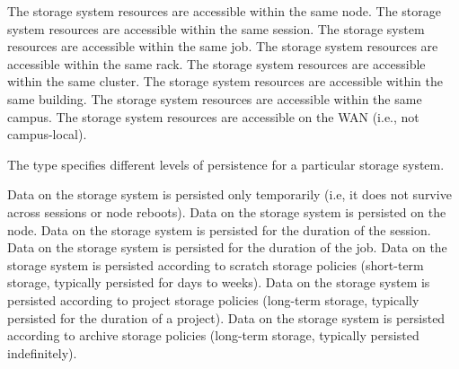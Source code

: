 \begin{constantdesc}
%
The storage system resources are accessible within the same node.
%
The storage system resources are accessible within the same session.
%
The storage system resources are accessible within the same job.
%
The storage system resources are accessible within the same rack.
%
The storage system resources are accessible within the same cluster.
%
The storage system resources are accessible within the same building.
%
The storage system resources are accessible within the same campus.
%
The storage system resources are accessible on the WAN (i.e., not campus-local).
%
\end{constantdesc}


The  type specifies different levels of persistence for a particular storage system.

\begin{constantdesc}
%
Data on the storage system is persisted only temporarily (i.e, it does not survive across sessions or node reboots).
%
Data on the storage system is persisted on the node.
%
Data on the storage system is persisted for the duration of the session.
%
Data on the storage system is persisted for the duration of the job.
%
Data on the storage system is persisted according to scratch storage policies (short-term storage, typically persisted for days to weeks).
%
Data on the storage system is persisted according to project storage policies (long-term storage, typically persisted for the duration of a project).
%
Data on the storage system is persisted according to archive storage policies (long-term storage, typically persisted indefinitely).
%
\end{constantdesc}

